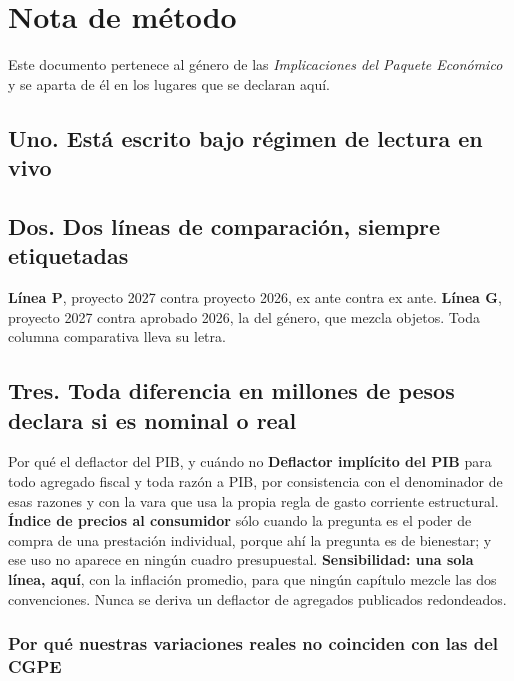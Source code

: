\chapter*{Nota de método}


Este documento pertenece al género de las \emph{Implicaciones del Paquete Económico} y se
aparta de él en los lugares que se declaran aquí.

\section*{Uno. Está escrito bajo régimen de lectura en vivo}
\section*{Dos. Dos líneas de comparación, siempre etiquetadas}

\textbf{Línea P}, proyecto 2027 contra proyecto 2026, ex ante contra ex ante. \textbf{Línea
G}, proyecto 2027 contra aprobado 2026, la del género, que mezcla objetos. Toda columna
comparativa lleva su letra.

\section*{Tres. Toda diferencia en millones de pesos declara si es nominal o real}

\begin{recuadro}{Por qué el deflactor del PIB, y cuándo no}
\textbf{Deflactor implícito del PIB} para todo agregado fiscal y toda razón a PIB, por
consistencia con el denominador de esas razones y con la vara que usa la propia regla de
gasto corriente estructural. \textbf{Índice de precios al consumidor} sólo cuando la pregunta
es el poder de compra de una prestación individual, porque ahí la pregunta es de bienestar; y
ese uso no aparece en ningún cuadro presupuestal. \textbf{Sensibilidad: una sola línea, aquí},
con la inflación promedio, para que ningún capítulo mezcle las dos convenciones. Nunca se
deriva un deflactor de agregados publicados redondeados.
\end{recuadro}

\subsection*{Por qué nuestras variaciones reales no coinciden con las del CGPE}

